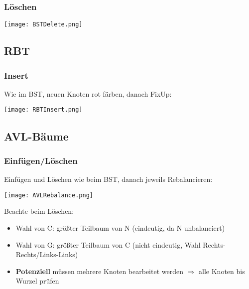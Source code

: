         \subsubsection*{Löschen}
            \centerline{\texttt{[image: BSTDelete.png]}}

    \subsection{RBT}
        \subsubsection*{Insert}
            \centerline{Wie im BST, neuen Knoten rot färben, danach FixUp:}
            \centerline{\texttt{[image: RBTInsert.png]}}

    \subsection{AVL-Bäume}
        \subsubsection*{Einfügen/Löschen}
            \centerline{Einfügen und Löschen wie beim BST, danach jeweils Rebalancieren:}
            \centerline{\texttt{[image: AVLRebalance.png]}}
            Beachte beim Löschen: 
                \begin{itemize}
                    \item Wahl von C: größter Teilbaum von N (eindeutig, da N unbalanciert)
                    \item Wahl von G: größter Teilbaum von C (nicht eindeutig, Wahl Rechts-Rechts/Links-Links)
                    \item \textbf{Potenziell} müssen mehrere Knoten bearbeitet werden $\Rightarrow$ alle Knoten bis Wurzel prüfen
                \end{itemize}
\pagebreak
